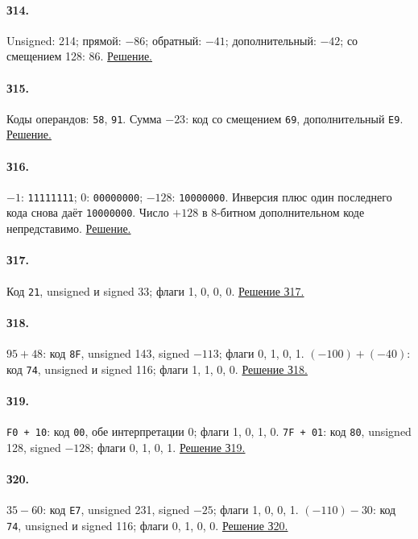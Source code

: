 \paragraph*{З14.}\label{ans:z14}
Unsigned: 214; прямой: $-86$; обратный: $-41$; дополнительный: $-42$; со смещением 128: 86.
\hyperref[sol:z14]{Решение.}

\paragraph*{З15.}\label{ans:z15}
Коды операндов: \texttt{58}, \texttt{91}. Сумма $-23$: код со смещением \texttt{69}, дополнительный \texttt{E9}.
\hyperref[sol:z15]{Решение.}

\paragraph*{З16.}\label{ans:z16}
$-1$: \texttt{11111111}; 0: \texttt{00000000}; $-128$: \texttt{10000000}. Инверсия плюс один последнего кода снова даёт \texttt{10000000}. Число $+128$ в 8-битном дополнительном коде непредставимо.
\hyperref[sol:z16]{Решение.}

\paragraph*{З17.}\label{ans:z17}
Код \texttt{21}, unsigned и signed 33; флаги 1, 0, 0, 0.
\hyperref[sol:z17]{Решение З17.}

\paragraph*{З18.}\label{ans:z18}
$95+48$: код \texttt{8F}, unsigned 143, signed $-113$; флаги 0, 1, 0, 1.
$(-100)+(-40)$: код \texttt{74}, unsigned и signed 116; флаги 1, 1, 0, 0.
\hyperref[sol:z18]{Решение З18.}

\paragraph*{З19.}\label{ans:z19}
\texttt{F0 + 10}: код \texttt{00}, обе интерпретации 0; флаги 1, 0, 1, 0.
\texttt{7F + 01}: код \texttt{80}, unsigned 128, signed $-128$; флаги 0, 1, 0, 1.
\hyperref[sol:z19]{Решение З19.}

\paragraph*{З20.}\label{ans:z20}
$35-60$: код \texttt{E7}, unsigned 231, signed $-25$; флаги 1, 0, 0, 1.
$(-110)-30$: код \texttt{74}, unsigned и signed 116; флаги 0, 1, 0, 0.
\hyperref[sol:z20]{Решение З20.}

